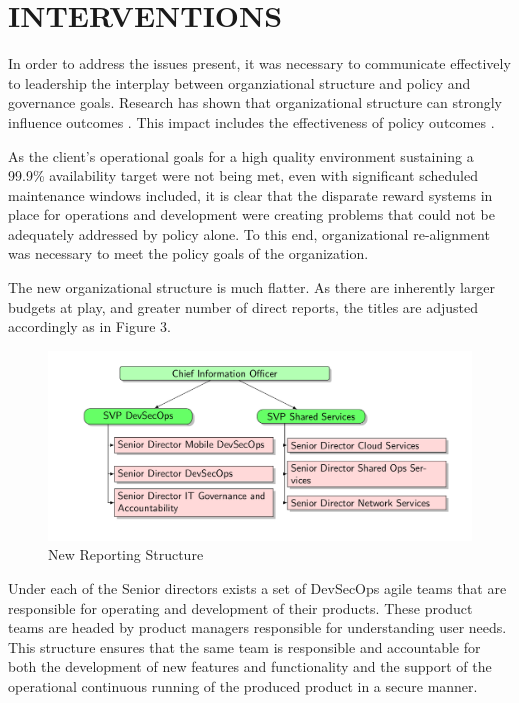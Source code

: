 \documentclass[doc]{apa7}
\begin{document}
\section{INTERVENTIONS}
\label{sec:org68670ba}

In order to address the issues present, it was necessary to communicate effectively to leadership the interplay between organziational structure and policy and governance goals. Research has shown that organizational structure can strongly influence outcomes  \citep{soderstromOrganizationalStructureInteraction2020}. This impact includes the effectiveness of policy outcomes \citep{erhemjamtsCorporateSocialResponsibility2012}.

As the client's operational goals for a high quality environment sustaining a 99.9\% availability target were not being met, even with significant scheduled maintenance windows included, it is clear that the disparate reward systems in place for operations and development were creating problems that could not be adequately addressed by policy alone. To this end, organizational re-alignment was necessary to meet the policy goals of the organization.

The new organizational structure is much flatter. As there are inherently larger budgets at play, and greater number of direct reports, the titles are adjusted accordingly as in Figure 3.

\begin{figure}[htbp]
\centering
\includegraphics[width=.9\linewidth]{./diag3.png}
\caption{New Reporting Structure}
\end{figure}

Under each of the Senior directors exists a set of DevSecOps agile teams that are responsible for operating and development of their products. These product teams are headed by product managers responsible for understanding user needs. This structure ensures that the same team is responsible and accountable for both the development of new features and functionality and the support of the operational continuous running of the produced product in a secure manner.
\end{document}
